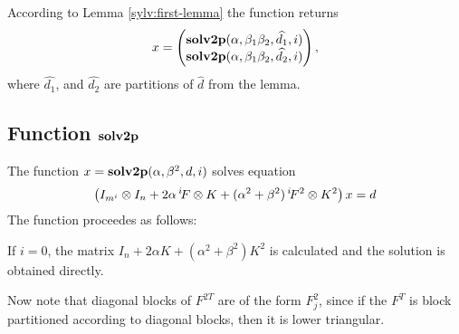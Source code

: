 \documentclass[11pt,a4paper]{article}
\begin{document}
According to Lemma \ref{sylv:first-lemma} the function returns
$$
x=\begin{pmatrix}\mathbf{solv2p}(\alpha,\beta_1\beta_2,\widehat{d_1},i)\cr
          \mathbf{solv2p}(\alpha,\beta_1\beta_2,\widehat{d_2},i)\end{pmatrix},
$$
where $\widehat{d_1}$, and $\widehat{d_2}$ are partitions of
$\widehat{d}$ from the lemma.

\subsection{Function $\mathbf{solv2p}$}

The function $x=\mathbf{solv2p}(\alpha,\beta^2,d,i)$ solves equation
$$
\left(I_{m^i}\otimes I_n + 2\alpha\,^i\!F\otimes K +
(\alpha^2+\beta^2)\,^i\!F^2\otimes K^2\right)x = d
$$ 
The function proceedes as follows:

If $i=0$, the matrix $I_n+2\alpha K+(\alpha^2+\beta^2)K^2$ is
calculated and the solution is obtained directly.

Now note that diagonal blocks of $F^{2T}$ are of the form $F_j^2$,
since if the $F^T$ is block partitioned according to diagonal blocks,
then it is lower triangular.
\end{document}
